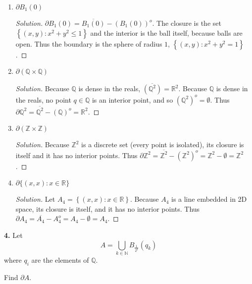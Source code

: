 \documentclass{article}
\newcommand{\R}{\mathbb{R}}
\newcommand{\Z}{\mathbb{Z}}
\newcommand{\N}{\mathbb{N}}
\newcommand{\Q}{\mathbb{Q}}
\newcommand{\set}[1]{\left\{ #1 \right\}}
\newcommand{\ol}[1]{\overline{#1}}
\newenvironment{solution}{\begin{proof}[Solution]}{\end{proof}}
\begin{document}
\renewcommand{\labelenumi}{(\arabic{enumi})}
\begin{enumerate}
    \item 
    $\partial B_1(0)$
    \begin{solution}
        $\partial B_1(0) = \ol{B_1(0)} - (B_1(0))^o$. The closure is the set $\set{(x, y) : x^2 + y^2 \le 1}$ and the interior is the ball itself, because balls are open. Thus the boundary is the sphere of radius $1$, $\set{(x, y) : x^2 + y^2 = 1}$.
    \end{solution}


    \item 
    $\partial(\Q \times \Q)$
    \begin{solution}
        Because $\Q$ is dense in the reals, $\ol{(\Q^2)} = \R^2$. Because $\Q$ is dense in the reals, no point $q \in \Q$ is an interior point, and so $(\Q^2)^o = \emptyset$. Thus $\partial\Q^2 = \ol{\Q^2} - (\Q)^o = \R^2$.

    \end{solution}


    \item 
    $\partial(\Z \times \Z)$
    \begin{solution}
        Because $\Z^2$ is a discrete set (every point is isolated), its closure is itself and it has no interior points. Thus $\partial \Z^2 = \ol{\Z^2} - (\Z^2)^o = \Z^2 - \emptyset = \Z^2$.

    \end{solution}


    \item 
    $\partial \{(x, x) : x \in \R\}$
    \begin{solution}
        Let $A_4 = \set{(x, x) : x \in \R}$. Because $A_4$ is a line embedded in 2D space, its closure is itself, and it has no interior points. Thus $\partial A_4 = \ol{A_4} - A_4^o = A_4 - \emptyset = A_4$.

        

    \end{solution}
\end{enumerate}

\newpage %

\textbf{4. }
Let
$$A = \bigcup_{k \in \N} B_{\frac{1}{2^k}}(q_k)$$
where $q_i$ are the elements of $\Q$.

Find $\partial A$.
\end{document}
